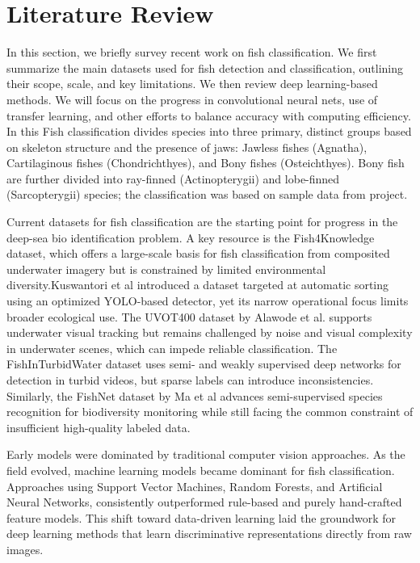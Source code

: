 \section{Literature Review}
In this section, we briefly survey recent work on fish classification. We first summarize the main datasets used for fish detection and classification, outlining their scope, scale, and key limitations. We then review deep learning-based methods. We will focus on the progress in convolutional neural nets, use of transfer learning, and other efforts to balance accuracy with computing efficiency. In this Fish classification divides species into three primary, distinct groups based on skeleton structure and the presence of jaws: Jawless fishes (Agnatha), Cartilaginous fishes (Chondrichthyes), and Bony fishes (Osteichthyes). Bony fish are further divided into ray-finned (Actinopterygii) and lobe-finned (Sarcopterygii) species; the classification was based on sample data from project. 

Current datasets for fish classification are the starting point for progress in the deep-sea bio identification problem. A key resource is the Fish4Knowledge dataset, which offers a large-scale basis for fish classification from composited underwater imagery but is constrained by limited environmental diversity.Kuswantori et al \cite{Kuswantori2022yolov4fish} introduced a dataset targeted at automatic sorting using an optimized YOLO-based detector, yet its narrow operational focus limits broader
ecological use. The UVOT400 dataset by Alawode et al. \cite{Alawode2023underwaterTracking} supports underwater visual tracking but remains challenged by noise and visual complexity in underwater scenes, which can impede reliable classification. The FishInTurbidWater dataset uses semi- and weakly supervised deep networks for detection in turbid videos, but sparse labels can introduce inconsistencies. Similarly, the FishNet dataset by Ma et al \cite{Ma2024semiSupervisedAquatic} advances semi-supervised species recognition for biodiversity monitoring while still facing the common constraint of insufficient high-quality labeled data. 

Early models were dominated by traditional computer vision approaches. As the field evolved, machine learning models became dominant for fish classification. Approaches using Support Vector Machines, Random Forests, and Artificial Neural Networks, consistently outperformed rule-based and purely hand-crafted feature models. This shift toward data-driven learning laid the groundwork for deep learning methods that learn discriminative representations directly from raw images. 


